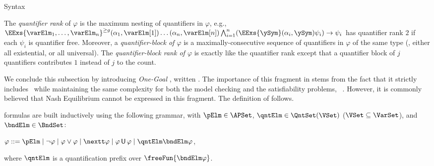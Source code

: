 \begin{subsection}{Syntax}
		
		
		The \emph{quantifier rank} of $\varphi$ is the maximum nesting of 
quantifiers in $\varphi$,
		e.g., $\EExs{\varElm_{1},\ldots, \varElm_{n}}^{\geq g} (\alpha_{1},  
\varElm[1]) \ldots \allowbreak
	(\alpha_{n}, \varElm[n]) \bigwedge_{i = 1}^{n} (\EExs{\ySym} (\alpha_{i},
	\ySym) \psi_{i}) \rightarrow \psi_{i}$ has quantifier rank $2$ if each 
$\psi_i$ is quantifier free.
		Moreover, a \emph{quantifier-block of $\varphi$} is a maximally-consecutive
		sequence of quantifiers in $\varphi$ of the same type (\ie, either all 
existential, or
		all universal). The \emph{quantifier-block rank of $\varphi$} is exactly 
like the quantifier rank
		except that a quantifier block of $j$ quantifiers contributes $1$ instead of 
$j$ to the count.

%
	We conclude this subsection by introducing \emph{One-Goal \GSLT}, written \OGGSLT.
	The importance of this fragment in \SL stems from the fact that it strictly includes \ATLS\ while maintaining the same complexity for
	both the model checking and the satisfiability problems, \ExpTimeC~\cite{MMPV12,MMPV14}. However, it is commonly believed that Nash
	Equilibrium cannot be expressed in this fragment.
	The definition of \OGGSLT follows.
	\begin{definition}
		\OGGSLT formulas are built inductively using the following grammar, with
		$\pElm \in \APSet$, $\qntElm \in
		\QntSet(\VSet)$ ($\VSet \subseteq \VarSet$),
		and $\bndElm \in \BndSet$:
			\begin{center}
				$\varphi ::= \pElm \mid \neg \varphi \mid
				\varphi \vee \varphi \mid \nextt \varphi \mid \varphi \until \varphi
				\mid \qntElm \bndElm \varphi$,
			\end{center}
			where $\qntElm$ is a quantification prefix over $\freeFun{\bndElm \varphi}$.
		\end{definition}


\end{subsection}
